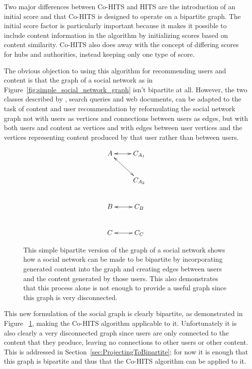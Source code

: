 Two major differences between Co-HITS and HITS are the introduction of an initial score and that Co-HITS is designed to operate on a bipartite graph. The initial score factor is particularly important because it makes it possible to include content information in the algorithm by initializing scores based on content similarity. Co-HITS also does away with the concept of differing scores for hubs and authorities, instead keeping only one type of score.

The obvious objection to using this algorithm for recommending users and content is that the graph of a social network as in Figure~\ref{fig:simple_social_network_graph} isn't bipartite at all. However, the two classes described by \cite{Deng2009}, search queries and web documents, can be adapted to the task of content and user recommendation by reformulating the social network graph not with users as vertices and connections between users as edges, but with both users and content as vertices and with edges between user vertices and the vertices representing content produced by that user rather than between users.

\begin{figure}
  \centering
\begin{displaymath}
  \xymatrix{
    A \ar@{<->}[r] \ar@{<->}[dr] & C_{A_{1}} \\
      &  C_{A_{2}} \\
    B \ar@{<->}[r] & C_{B} \\
    C \ar@{<->}[r] & C_{C} }
\end{displaymath} 
  \caption[Simple bipartite graph of a social network]{This simple bipartite version of the graph of a social network shows how a social network can be made to be bipartite by incorporating generated content into the graph and creating edges between users and the content generated by those users. This also demonstrates that this process alone is not enough to provide a useful graph since this graph is very disconnected.}
\label{fig:disconnected_bipartite_graph}
\end{figure}

This new formulation of the social graph is clearly bipartite, as demonstrated in Figure ~\ref{fig:disconnected_bipartite_graph}, making the Co-HITS algorithm applicable to it. Unfortunately it is also clearly a very disconnected graph since users are only connected to the content that they produce, leaving no connections to other users or other content. This is addressed in Section~\ref{sec:ProjectingToBipartite}; for now it is enough that this graph is bipartite and thus that the Co-HITS algorithm can be applied to it.


